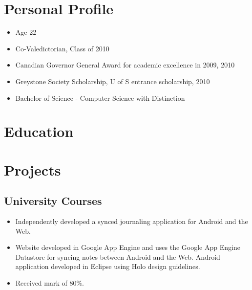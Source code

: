\documentclass[11pt,letterpaper,sans]{moderncv}        %
\begin{document}
\section{Personal Profile}
\cvitem{}
{
  \begin{itemize}
    \item Age 22
    \item Co-Valedictorian, Class of 2010
    \item Canadian Governor General Award for academic excellence in 2009, 2010
    \item Greystone Society Scholarship, U of S entrance scholarship, 2010
    \item Bachelor of Science - Computer Science with Distinction
  \end{itemize}
}


\section{Education}


\section{Projects}
\subsection{University Courses}
{
  \begin{itemize}
    \item Independently developed a synced journaling application for Android and the Web.
    \item Website developed in Google App Engine and uses the Google App Engine Datastore for syncing notes between Android and the Web. Android application developed in Eclipse using Holo design guidelines.
    \item Received mark of 80\%.
  \end{itemize}
}
\end{document}
